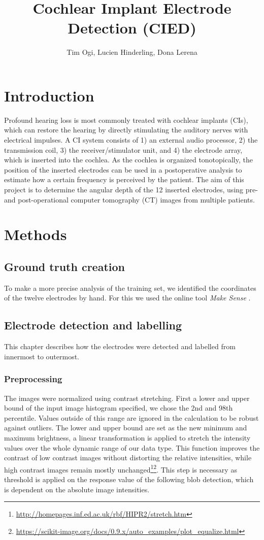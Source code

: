 \documentclass[a4paper, 11pt]{article}
\title{\textbf{Cochlear Implant Electrode Detection (CIED)}}
\author{Tim Ogi, Lucien Hinderling, Dona Lerena}
\begin{document}
\maketitle
\section{Introduction}
Profound hearing loss is most commonly treated with cochlear implants (CIs), which can restore the hearing by directly stimulating the auditory nerves with electrical impulses. A CI system consists of 1) an external audio processor, 2) the transmission coil, 3) the receiver/stimulator unit, and 4) the electrode array, which is inserted into the cochlea. As the cochlea is organized tonotopically, the position of the inserted electrodes can be used in a postoperative analysis to estimate how a certain frequency is perceived by the patient. The aim of this project is to determine the angular depth of the 12 inserted electrodes, using pre- and post-operational computer tomography (CT) images from multiple patients.


\section{Methods}
\subsection{Ground truth creation}
To make a more precise analysis of the training set, we identified the coordinates of the twelve electrodes by hand. For this we used the online tool  \emph{Make Sense} \cite{makesense} .
\subsection{Electrode detection and labelling}
This chapter describes how the electrodes were detected and labelled from innermost to outermost.
\subsubsection{Preprocessing}
The images were normalized using contrast stretching. First a lower and upper bound of the input image histogram specified, we chose the 2nd and 98th percentile. Values outside of this range are ignored in the calculation to be robust against outliers. The lower and upper bound are set as the new minimum and maximum brightness, a linear transformation is applied to stretch the intensity values over the whole dynamic range of our data type. This function improves the contrast of low contrast images without distorting the relative intensities, while high contrast images remain mostly unchanged\footnote{\url{http://homepages.inf.ed.ac.uk/rbf/HIPR2/stretch.htm}}\footnote{\url{https://scikit-image.org/docs/0.9.x/auto_examples/plot_equalize.html}}. This step is necessary as threshold is applied on the response value of the following blob detection, which is dependent on the absolute image intensities.
\end{document}
